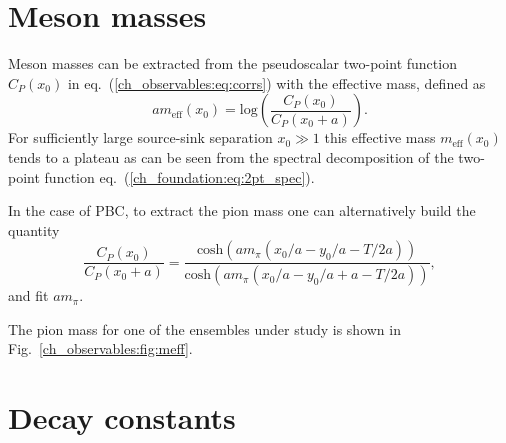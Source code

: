 
\section{Meson masses}
\label{ch_observables:sec:meson_mass}

Meson masses can be extracted from the pseudoscalar two-point function $C_P(x_0)$ in eq.~(\ref{ch_observables:eq:corrs}) with the effective mass, defined as
\begin{equation}
\label{ch_observables:eq:meff}
am_{\textrm{eff}}(x_0)={\textrm{log}}\left(\frac{C_P(x_0)}{C_P(x_0+a)}\right).
\end{equation}
For sufficiently large source-sink separation $x_0\gg 1$ this effective mass $m_{\textrm{eff}}(x_0)$ tends to a plateau as can be seen from the spectral decomposition of the two-point function eq.~(\ref{ch_foundation:eq:2pt_spec}).

In the case of PBC, to extract the pion mass one can alternatively build the quantity
\begin{equation}
\label{ch_observables:eq:meff_PBC}
\frac{C_P(x_0)}{C_P(x_0+a)}=\frac{{\textrm{cosh}}(am_{\pi}(x_0/a-y_0/a-T/2a))}{{\textrm{cosh}}(am_{\pi}(x_0/a-y_0/a+a-T/2a))},
\end{equation}
and fit $am_{\pi}$.

The pion mass for one of the ensembles under study is shown in Fig.~\ref{ch_observables:fig:meff}.


\section{Decay constants}
\label{ch_observables:sec:dec_const}

